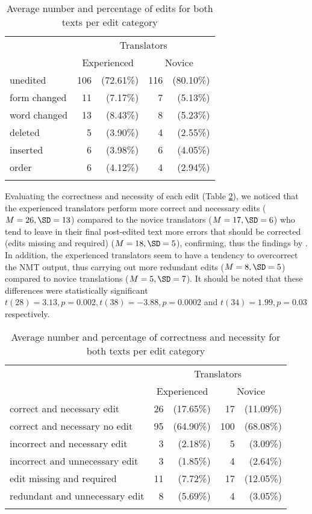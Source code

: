 \documentclass[output=paper]{langscibook}
\begin{document}
\begin{table}
\caption{Average number and percentage of edits for both texts per edit category}
\label{tab:1:Edits}
 \begin{tabular}{l r@{ }r r@{ }r}
  \lsptoprule
    & \multicolumn{4}{c}{Translators}\\\cmidrule(lr){2-5}
    & \multicolumn{2}{c}{Experienced} & \multicolumn{2}{c}{Novice}\\
  \midrule
   unedited & 106  & (72.61\%) & 116  & (80.10\%)  \\
   form changed & 11  & (7.17\%) & 7  & (5.13\%)\\
   word changed & 13  & (8.43\%) & 8  & (5.23\%) \\
   deleted & 5  & (3.90\%) & 4  & (2.55\%)\\
   inserted & 6  & (3.98\%) & 6  & (4.05\%)\\
   order & 6  & (4.12\%) & 4  & (2.94\%)\\
   \lspbottomrule
 \end{tabular}
\end{table}

Evaluating the correctness and necessity of each edit (Table \ref{tab:1:correctness and necessity}), we noticed that the experienced translators perform more correct and necessary edits ($M = 26, \SD = 13$) compared to the novice translators ($M = 17, \SD = 6$) who tend to leave in their final post-edited text more errors that should be corrected (edits missing and required) ($M = 18, \SD = 5$), confirming, thus the findings by \citet{Depraetere2010}. In addition, the experienced translators seem to have a tendency to overcorrect the NMT output, thus carrying out more redundant edits ($M = 8, \SD = 5$) compared to novice translations ($M = 5, \SD = 7$). It should be noted that these differences were statistically significant $t(28) = 3.13, p = 0.002, t(38) = -3.88, p = 0.0002$ and $t(34) = 1.99, p = 0.03$ respectively.

\begin{table}[t]
\caption{Average number and percentage of correctness and necessity for both texts per edit category}
\label{tab:1:correctness and necessity}
 \begin{tabular}{l r@{ }r r@{ }r}
  \lsptoprule
    & \multicolumn{4}{c}{Translators}\\\cmidrule(lr){2-5}
    & \multicolumn{2}{c}{Experienced} & \multicolumn{2}{c}{Novice}\\
  \midrule
   correct and necessary edit & 26  & (17.65\%) & 17  & (11.09\%)  \\
   correct and necessary no edit & 95  & (64.90\%) & 100  & (68.08\%)\\
   incorrect and necessary edit & 3  & (2.18\%) & 5  & (3.09\%) \\
   incorrect and unnecessary edit & 3  & (1.85\%) & 4  & (2.64\%)\\
   edit missing and required & 11  & (7.72\%) & 17  & (12.05\%)\\
   redundant and unnecessary edit & 8  & (5.69\%) & 4  & (3.05\%)\\
   \lspbottomrule
 \end{tabular}
\end{table}
\end{document}
